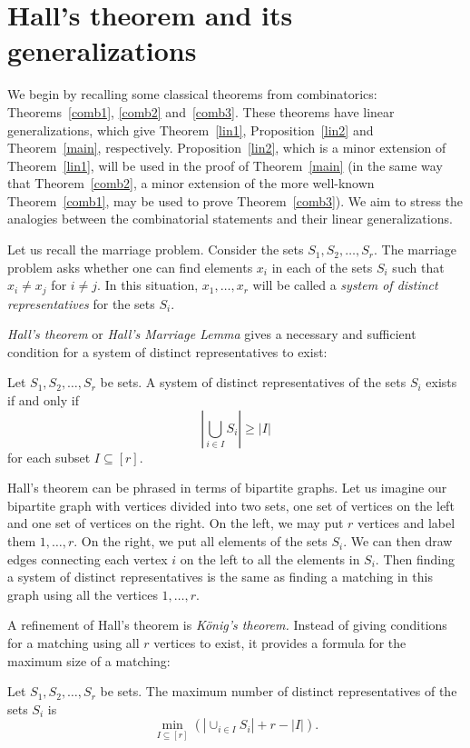 \section{Hall's theorem and its generalizations}\label{sect2}

We begin by recalling some classical theorems from combinatorics: Theorems~\ref{comb1}, \ref{comb2} and~\ref{comb3}. These theorems have linear generalizations, which give Theorem~\ref{lin1}, Proposition~\ref{lin2} and Theorem~\ref{main}, respectively. Proposition~\ref{lin2}, which is a minor extension of Theorem~\ref{lin1}, will be used in the proof of Theorem~\ref{main} (in the same way that Theorem~\ref{comb2}, a minor extension of the more well-known Theorem~\ref{comb1}, may be used to prove Theorem~\ref{comb3}). We aim to stress the analogies between the combinatorial statements and their linear generalizations.

Let us recall the marriage problem. Consider the sets $S_1, S_2, \dots, S_r$. The marriage problem asks whether one can find elements $x_i$ in each of the sets $S_i$ such that $x_i \neq x_j$ for $i \neq j$. In this situation, $x_1, \dots, x_r$ will be called a \emph{system of distinct representatives} for the sets $S_i$.

\emph{Hall's theorem} or \emph{Hall's Marriage Lemma} gives a necessary and sufficient condition for a system of distinct representatives to exist:
\begin{theorem}[Hall] \label{comb1}
Let $S_1,S_2,\ldots,S_r$ be sets. A system of distinct representatives of the sets $S_i$ exists if and only if
\[
 \left|\bigcup_{i \in I} S_i\right| \geq |I| %
\]
for each subset $I \subseteq [r]$.
\end{theorem}

Hall's theorem can be phrased in terms of bipartite graphs. Let us imagine our bipartite graph with vertices divided into two sets, one set of vertices on the left and one set of vertices on the right. On the left, we may put $r$ vertices and label them $1, \dots, r$. On the right, we put all elements of the sets $S_i$. We can then draw edges connecting each vertex $i$ on the left to all the elements in $S_i$. Then finding a system of distinct representatives is the same as finding a matching in this graph using all the vertices $1, \dots, r$.

A refinement of Hall's theorem is \emph{K{\"o}nig's theorem.} Instead of giving conditions for a matching using all $r$ vertices to exist, it provides a formula for the maximum size of a matching:
\begin{theorem}[K{\"o}nig] \label{comb2}
Let $S_1,S_2, \dots,S_r$ be sets. The maximum number of distinct representatives of the sets $S_i$ is
\[
 \min_{I \subseteq [r]} \left( \left| \cup_{i\in I} S_i \right| + r - |I| \right). 
\]
\end{theorem}

